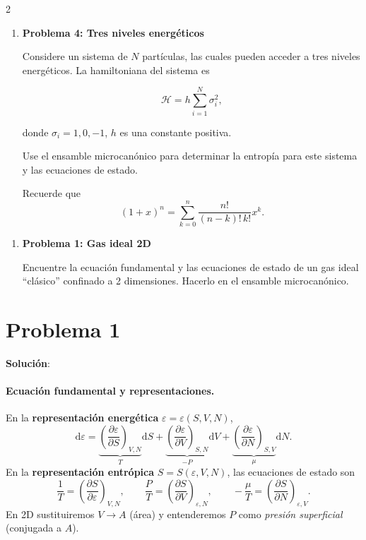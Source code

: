 \documentclass{article}
\begin{document}
\begin{multicols}{2}
\begin{enumerate}[label={{\textcolor{trueblue}{\textbf{Ej}. \arabic*.0}}}, start=4]
\item \textbf{Problema 4: Tres niveles energéticos}

Considere un sistema de $N$ partículas, las cuales pueden acceder a tres niveles energéticos.  
La hamiltoniana del sistema es

\[
\mathcal{H} = h \sum_{i=1}^{N} \sigma_i^2,
\]

donde $\sigma_i = 1, 0, -1$, $h$ es una constante positiva.  

Use el ensamble microcanónico para determinar la entropía para este sistema y las ecuaciones de estado.  

Recuerde que
\[
(1+x)^n = \sum_{k=0}^n \frac{n!}{(n-k)! \, k!} x^k.
\]
\end{enumerate}

\end{multicols}


\tableofcontents \vspace{2cm}

\begin{enumerate}[label={{\textcolor{trueblue}{\textbf{Ej}. \arabic*.0}}}, start=1]
\item \textbf{Problema 1: Gas ideal 2D}

Encuentre la ecuación fundamental y las ecuaciones de estado de un gas ideal ``clásico'' confinado a 2 dimensiones.  
Hacerlo en el ensamble microcanónico.
\end{enumerate}
\section*{Problema 1}

\textcolor{Cinnabar}{\textbf{Solución}}:

\paragraph{Ecuación fundamental y representaciones.}
En la \textbf{representación energética} \(\varepsilon=\varepsilon(S,V,N)\),
\[
\mathrm d\varepsilon
= \underbrace{\left(\frac{\partial \varepsilon}{\partial S}\right)_{V,N}}_{T}\mathrm dS
+ \underbrace{\left(\frac{\partial \varepsilon}{\partial V}\right)_{S,N}}_{-P}\mathrm dV
+ \underbrace{\left(\frac{\partial \varepsilon}{\partial N}\right)_{S,V}}_{\mu}\mathrm dN.
\]
En la \textbf{representación entrópica} \(S=S(\varepsilon,V,N)\), las ecuaciones de estado son
\[
\frac{1}{T}=\left(\frac{\partial S}{\partial \varepsilon}\right)_{V,N},\qquad
\frac{P}{T}=\left(\frac{\partial S}{\partial V}\right)_{\varepsilon,N},\qquad
-\frac{\mu}{T}=\left(\frac{\partial S}{\partial N}\right)_{\varepsilon,V}.
\]
En 2D sustituiremos \(V\to A\) (área) y entenderemos \(P\) como \emph{presión superficial} (conjugada a \(A\)).
\end{document}

